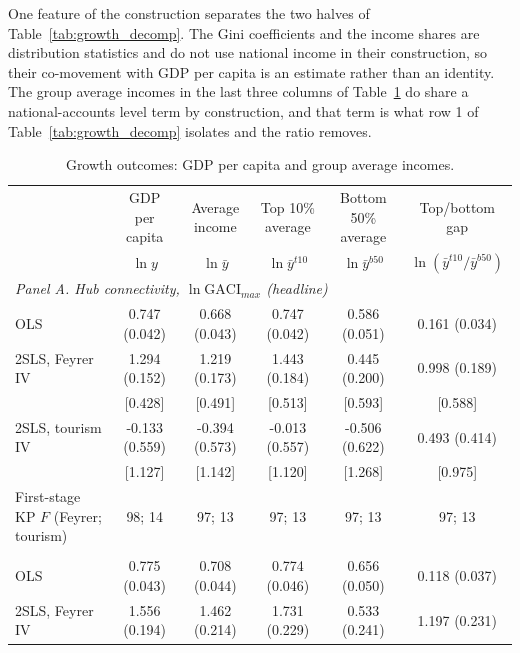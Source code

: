 One feature of the construction separates the two halves of Table~\ref{tab:growth_decomp}. The Gini coefficients and the income shares are distribution statistics and do not use national income in their construction, so their co-movement with GDP per capita is an estimate rather than an identity. The group average incomes in the last three columns of Table~\ref{tab:growth} do share a national-accounts level term by construction, and that term is what row 1 of Table~\ref{tab:growth_decomp} isolates and the ratio removes.

\begin{table}[H]\centering\caption{Growth outcomes: GDP per capita and group average incomes.}\label{tab:growth}
\begin{threeparttable}\small\begin{tabular}{lccccc}
\toprule
 & GDP per capita & Average income & Top 10\% average & Bottom 50\% average & Top/bottom gap \\
 & $\ln y$ & $\ln \bar{y}$ & $\ln \bar{y}^{t10}$ & $\ln \bar{y}^{b50}$ & $\ln(\bar{y}^{t10}/\bar{y}^{b50})$ \\
\midrule
\multicolumn{6}{l}{\emph{Panel A. Hub connectivity, $\ln\mathrm{GACI}_{max}$ (headline)}}\\
OLS & 0.747\sym{***} (0.042) & 0.668\sym{***} (0.043) & 0.747\sym{***} (0.042) & 0.586\sym{***} (0.051) & 0.161\sym{***} (0.034) \\
2SLS, Feyrer IV & 1.294\sym{***} (0.152) & 1.219\sym{***} (0.173) & 1.443\sym{***} (0.184) & 0.445\sym{**} (0.200) & 0.998\sym{***} (0.189) \\
 & [0.428]\sym{***} & [0.491]\sym{**} & [0.513]\sym{***} & [0.593] & [0.588]\sym{*} \\
2SLS, tourism IV & -0.133 (0.559) & -0.394 (0.573) & -0.013 (0.557) & -0.506 (0.622) & 0.493 (0.414) \\
 & [1.127] & [1.142] & [1.120] & [1.268] & [0.975] \\
First-stage KP $F$ (Feyrer; tourism) & 98; 14 & 97; 13 & 97; 13 & 97; 13 & 97; 13 \\
\addlinespace
\multicolumn{6}{l}{\emph{Panel B. Hub quality, $\ln\mathrm{GACI}_{cwm}$}}\\
OLS & 0.775\sym{***} (0.043) & 0.708\sym{***} (0.044) & 0.774\sym{***} (0.046) & 0.656\sym{***} (0.050) & 0.118\sym{***} (0.037) \\
2SLS, Feyrer IV & 1.556\sym{***} (0.194) & 1.462\sym{***} (0.214) & 1.731\sym{***} (0.229) & 0.533\sym{**} (0.241) & 1.197\sym{***} (0.231) \\

\end{tabular}
\end{threeparttable}
\end{table}
